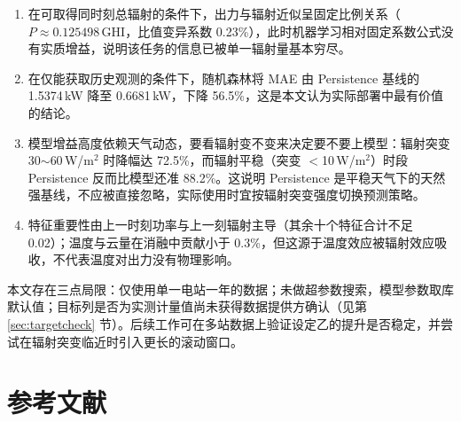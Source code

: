 \documentclass[11pt,a4paper]{ctexart}
\begin{document}
\begin{enumerate}
\item 在可取得同时刻总辐射的条件下，出力与辐射近似呈固定比例关系（$P\approx0.125498\,\mathrm{GHI}$，比值变异系数 0.23\%），此时机器学习相对固定系数公式没有实质增益，说明该任务的信息已被单一辐射量基本穷尽。
\item 在仅能获取历史观测的条件下，随机森林将 MAE 由 Persistence 基线的 1.5374\,kW 降至 0.6681\,kW，下降 56.5\%，这是本文认为实际部署中最有价值的结论。
\item 模型增益高度依赖天气动态，要看辐射变不变来决定要不要上模型：辐射突变 30$\sim$60\,W/m$^2$ 时降幅达 72.5\%，而辐射平稳（突变 $<$10\,W/m$^2$）时段 Persistence 反而比模型还准 88.2\%。这说明 Persistence 是平稳天气下的天然强基线，不应被直接忽略，实际使用时宜按辐射突变强度切换预测策略。
\item 特征重要性由上一时刻功率与上一刻辐射主导（其余十个特征合计不足 0.02）；温度与云量在消融中贡献小于 0.3\%，但这源于温度效应被辐射效应吸收，不代表温度对出力没有物理影响。
\end{enumerate}

本文存在三点局限：仅使用单一电站一年的数据；未做超参数搜索，模型参数取库默认值；目标列是否为实测计量值尚未获得数据提供方确认（见第 \ref{sec:targetcheck} 节）。后续工作可在多站数据上验证设定乙的提升是否稳定，并尝试在辐射突变临近时引入更长的滚动窗口。

\section{参考文献}

\end{document}
